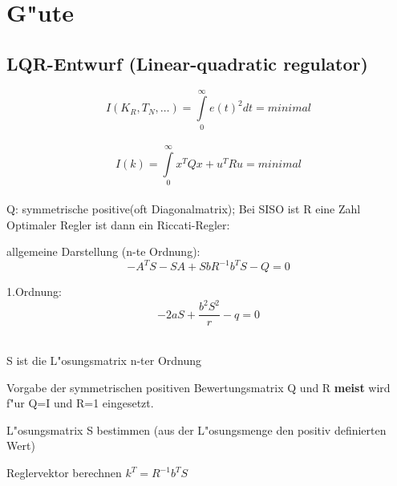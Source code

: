 \section{G"ute}
\subsection{LQR-Entwurf (Linear-quadratic regulator)}
	$$I(K_R,T_N,\ldots)=\int\limits^{\infty}_0 e(t)^2 dt = minimal$$\\
	$$I(k)=\int\limits_0^{\infty} {x^T Q x+u^T R u}= minimal$$\\
	Q: symmetrische positive(oft Diagonalmatrix); Bei SISO ist R eine Zahl\\
	Optimaler Regler ist dann ein Riccati-Regler:\\
	\begin{minipage}{10cm}
	allgemeine Darstellung (n-te Ordnung):\\
	$$ -A^T S - S A + S b R^{-1} b^T S - Q = 0$$
	\end{minipage}
	\begin{minipage}{6cm}
    1.Ordnung:\\
    $$-2aS+\frac{b^2S^2}{r}-q=0$$
    \end{minipage}\\
	S ist die L"osungsmatrix n-ter Ordnung 
	\begin{aufzaehlung}
    	\item Vorgabe der symmetrischen positiven Bewertungsmatrix Q und R
    	\textbf{meist} wird f"ur Q=I und R=1 eingesetzt.
    	\item L"osungsmatrix S bestimmen (aus der L"osungsmenge den positiv
    	definierten Wert)
    	\item Reglervektor berechnen $k^T=R^{-1} b^T S$
    \end{aufzaehlung}
